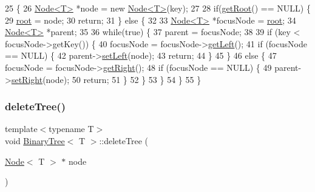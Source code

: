\begin{DoxyCode}
25                             \{
26             \hyperlink{classNode}{Node<T>} *node = \textcolor{keyword}{new} \hyperlink{classNode}{Node<T>}(key);
27 
28             \textcolor{keywordflow}{if}(\hyperlink{classBinaryTree_af525a78601eba600d880d1cd947a215a}{getRoot}() == NULL) \{
29                 \hyperlink{classBinaryTree_a2db40f59d96afceb1a005e6d9aef2374}{root} = node;
30                 \textcolor{keywordflow}{return};
31             \} \textcolor{keywordflow}{else} \{   
32 
33                 \hyperlink{classNode}{Node<T>} *focusNode = \hyperlink{classBinaryTree_a2db40f59d96afceb1a005e6d9aef2374}{root};
34                 \hyperlink{classNode}{Node<T>} *parent;
35 
36                 \textcolor{keywordflow}{while}(\textcolor{keyword}{true}) \{
37                     parent = focusNode;
38 
39                     \textcolor{keywordflow}{if} (key < focusNode->getKey()) \{
40                         focusNode = focusNode->\hyperlink{classNode_a1c884e62ef0a9b5dd4f35dbea09145f2}{getLeft}();
41                         \textcolor{keywordflow}{if} (focusNode == NULL) \{
42                             parent->\hyperlink{classNode_afc70e20117ea8083d11736f5ea8a9216}{setLeft}(node);
43                             \textcolor{keywordflow}{return};
44                         \}
45                     \}
46                     \textcolor{keywordflow}{else} \{
47                         focusNode = focusNode->\hyperlink{classNode_af9078f2651b16fc1a3502d7927761df1}{getRight}();
48                         \textcolor{keywordflow}{if} (focusNode == NULL) \{
49                             parent->\hyperlink{classNode_ad5c1f634547b3e2d03c3d55d355c0c17}{setRight}(node);
50                             \textcolor{keywordflow}{return};
51                         \}
52                     \}
53                 \}
54             \}
55         \}
\end{DoxyCode}
\mbox{\label{classBinaryTree_a4653328dc7727b7c32285bb50a10f6c9}} 
\subsubsection{\texorpdfstring{delete\+Tree()}{deleteTree()}}
{\footnotesize\ttfamily template$<$typename T$>$ \\
void \hyperlink{classBinaryTree}{Binary\+Tree}$<$ T $>$\+::delete\+Tree (\begin{DoxyParamCaption}\item[{\hyperlink{classNode}{Node}$<$ T $>$ $\ast$}]{node }\end{DoxyParamCaption})\hspace{0.3cm}{\ttfamily [inline]}}

